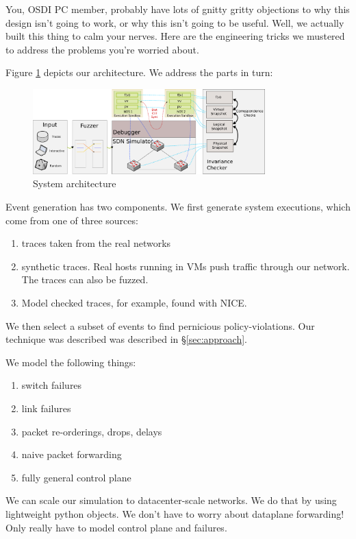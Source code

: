 
You, OSDI PC member, probably have lots of gnitty gritty objections to why
this design isn't going to work, or why this isn't going to be useful. Well,
we actually built this thing to calm your nerves.
Here are the engineering tricks we mustered to address the problems
you're worried about.

Figure \ref{fig:system} depicts our architecture. We address the parts in turn:
\begin{figure}[!t]
  \centering
  \includegraphics[width=0.8\textwidth]{../diagrams/architecture/architecture.pdf}
  \caption{System architecture}
  \label{fig:system}
\end{figure}

 Event generation has two components.
We first generate system executions, which come from one of three sources:
\begin{enumerate}
\item traces taken from the real networks
\item synthetic traces. Real hosts running in VMs push traffic through our
network. The traces can also be fuzzed. 
\item Model checked traces, for example, found with NICE.
\end{enumerate}

We then select a subset of events to find pernicious policy-violations. Our
technique was described was described in \S\ref{sec:approach}.

 We model the following things: 
\begin{enumerate}
\item switch failures
\item link failures
\item packet re-orderings, drops, delays
\item naive packet forwarding
\item fully general control plane
\end{enumerate}

We can scale our simulation to datacenter-scale networks. We do that by using lightweight python objects. We don't have to worry
about dataplane forwarding! Only really have to model control plane and failures.

